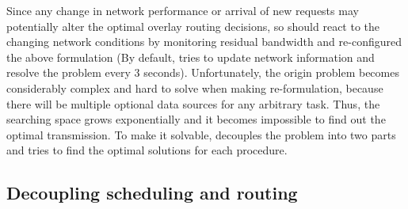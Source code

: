 Since any change in network performance or arrival of
new requests may potentially alter the optimal overlay
routing decisions,
so \name should react to the changing network conditions by monitoring residual bandwidth and re-configured the above formulation (By default, \name tries to update network information and resolve the problem every 3 seconds). Unfortunately, the origin problem becomes considerably complex and hard to solve when making re-formulation, because there will be multiple optional data sources for any arbitrary task. Thus, the searching space grows exponentially and it becomes impossible to find out the optimal transmission. To make it solvable, \name decouples the problem into two parts and tries to find the optimal solutions for each procedure.

\subsection{Decoupling scheduling and routing}
\label{subsec:logic:separation}

